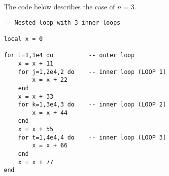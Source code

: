 The code below describes the case of $n=3$.

\begin{mdframed}[style=LuaStyleFrame]
\begin{lstlisting}[style=LuaStyle]
-- Nested loop with 3 inner loops

local x = 0

for i=1,1e4 do          -- outer loop
	x = x + 11
    for j=1,2e4,2 do    -- inner loop (LOOP 1)
		x = x + 22
	end
	x = x + 33
    for k=1,3e4,3 do    -- inner loop (LOOP 2)
		x = x + 44 
	end
	x = x + 55
    for t=1,4e4,4 do    -- inner loop (LOOP 3)
		x = x + 66
	end
	x = x + 77 
end
\end{lstlisting}
\end{mdframed}

